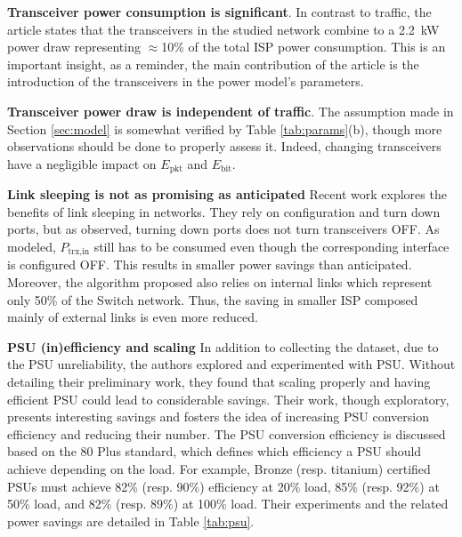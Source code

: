 \textbf{Transceiver power consumption is significant}.
In contrast to traffic, the article states that the transceivers in the studied network combine to a \qty{2.2}{\kilo \watt} power draw representing $\approx$10\% of the total ISP power consumption.
This is an important insight, as a reminder, the main contribution of the article is the introduction of the transceivers in the power model's parameters.

\textbf{Transceiver power draw is independent of traffic}.
The assumption made in Section \ref{sec:model} is somewhat verified by Table \ref{tab:params}(b), though more observations should be done to properly assess it. 
Indeed, changing transceivers have a negligible impact on $E_\text{pkt}$ and $E_\text{bit}$. 


\textbf{Link sleeping is not as promising as anticipated}
Recent work \cite{Hypnos} explores the benefits of link sleeping in networks.
They rely on configuration and turn down ports, but as observed, turning down ports does not turn transceivers OFF. 
As modeled, $P_\text{trx,in}$ still has to be consumed even though the corresponding interface is configured OFF. 
This results in smaller power savings than anticipated. 
Moreover, the algorithm proposed also relies on internal links which represent only 50\% of the Switch network.
Thus, the saving in smaller ISP composed mainly of external links is even more reduced.

\textbf{PSU (in)efficiency and scaling}
In addition to collecting the dataset, due to the PSU unreliability, the authors explored and experimented with PSU.   
Without detailing their preliminary work, they found that scaling properly and having efficient PSU could lead to considerable savings.    
Their work, though exploratory, presents interesting savings and fosters the idea of increasing PSU conversion efficiency and reducing their number.
The PSU conversion efficiency is discussed based on the 80 Plus standard, which defines which efficiency a PSU should achieve depending on the load. 
For example, Bronze (resp. titanium) certified PSUs must achieve 82\% (resp. 90\%) efficiency at 20\% load, 85\% (resp. 92\%) at 50\% load, and 82\% (resp. 89\%) at 100\% load. 
Their experiments and the related power savings are detailed in Table \ref{tab:psu}.  


